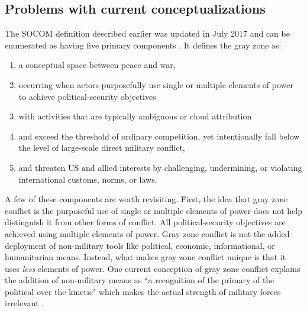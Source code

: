 \documentclass[12pt,letterpaper]{article}
\begin{document}
	\subsection*{Problems with current conceptualizations}
		The SOCOM definition described earlier was updated in July 2017 and can be enumerated as having five primary components \citep{bragg_integrationreportgray_2017}. It defines the gray zone as:
		
		\begin{enumerate}
			\item a conceptual space between peace and war,
			\item occurring when actors purposefully use single or multiple elements of power to achieve political-security objectives
			\item with activities that are typically ambiguous or cloud attribution
			\item and exceed the threshold of ordinary competition, yet intentionally fall below the level of large-scale direct military conflict,
			\item and threaten US and allied interests by challenging, undermining, or violating international customs, norms, or laws.
		\end{enumerate}
		
		A few of these components are worth revisiting. First, the idea that gray zone conflict is the purposeful use of single or multiple elements of power does not help distinguish it from other forms of conflict. All political-security objectives are achieved using multiple elements of power. Gray zone conflict is not the added deployment of non-military tools like political, economic, informational, or humanitarian means. Instead, what makes gray zone conflict unique is that it uses \textit{less} elements of power. One current conception of gray zone conflict explains the addition of non-military means as ``a recognition of the primary of the political over the kinetic" which makes the actual strength of military forces irrelevant  \citep{galeotti_hybridambiguousnonlinear_2016}.
		
\end{document}
